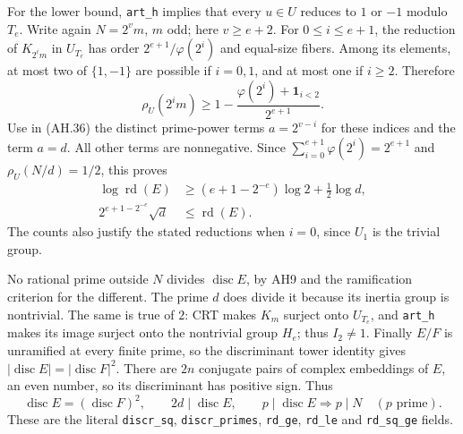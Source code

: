 For the lower bound, \texttt{art\_h} implies that every $u\in U$ reduces
to $1$ or $-1$ modulo $T_e$. Write again $N=2^v m$, $m$ odd; here
$v\ge e+2$. For $0\le i\le e+1$, the reduction of $K_{2^i m}$ in
$U_{T_e}$ has order $2^{e+1}/\varphi(2^i)$ and equal-size fibers.
Among its elements, at most two of $\{1,-1\}$ are possible if $i=0,1$,
and at most one if $i\ge2$. Therefore
\[
 \rho_U(2^i m)\ge
     1-\frac{\varphi(2^i)+\mathbf1_{i<2}}{2^{e+1}}.
\]
Use in (AH.36) the distinct prime-power terms $a=2^{v-i}$ for these
indices and the term $a=d$. All other terms are nonnegative.
Since $\sum_{i=0}^{e+1}\varphi(2^i)=2^{e+1}$ and
$\rho_U(N/d)=1/2$, this proves
\[
 \begin{split}
 \log\operatorname{rd}(E)
   &\ge(e+1-2^{-e})\log2+\tfrac12\log d,\\
 2^{e+1-2^{-e}}\sqrt d&\le\operatorname{rd}(E).  \tag{AH.43}
 \end{split}
\]
The counts also justify the stated reductions when $i=0$, since
$U_1$ is the trivial group.

No rational prime outside $N$ divides $\operatorname{disc}E$, by AH9 and
the ramification criterion for the different. The prime $d$ does divide
it because its inertia group is nontrivial. The same is true of $2$:
CRT makes $K_m$ surject onto $U_{T_e}$, and \texttt{art\_h} makes its
image surject onto the nontrivial group $H_e$; thus $I_2\ne1$.
Finally $E/F$ is unramified at every finite prime, so the discriminant
tower identity gives $|\operatorname{disc}E|=|\operatorname{disc}F|^2$.
There are $2n$ conjugate pairs of complex embeddings of $E$, an even
number, so its discriminant has positive sign. Thus
\[
 \operatorname{disc}E=(\operatorname{disc}F)^2,\qquad
 2d\mid\operatorname{disc}E,\qquad
 p\mid\operatorname{disc}E\Longrightarrow p\mid N
 \quad(p\text{ prime}).                         \tag{AH.44}
\]
These are the literal \texttt{discr\_sq}, \texttt{discr\_primes},
\texttt{rd\_ge}, \texttt{rd\_le} and \texttt{rd\_sq\_ge} fields.

